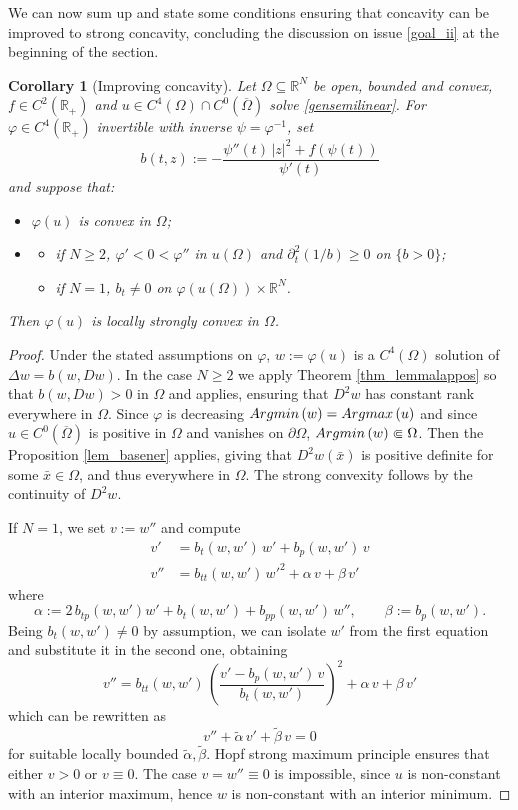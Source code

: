 \documentclass[12pt]{amsart}
\numberwithin{equation}{section}
\theoremstyle{plain}
\theoremstyle{plain}
\theoremstyle{plain}
\newtheorem{corollary}[theorem]{Corollary}
\theoremstyle{definition}
\newcommand{\R}{{\mathbb R}}
\renewcommand{\ge}{\geqslant}
\begin{document}
We can now sum up and state some conditions ensuring that concavity can be improved to strong concavity, concluding the discussion on issue \eqref{goal_ii} at the beginning of the section.

 \begin{corollary}[Improving concavity]
 \label{corstrongconv}
 Let $\Omega\subseteq \R^N$ be open, bounded and convex, $f\in C^2(\R_+)$ and $u\in C^4(\Omega)\cap C^0(\overline{\Omega})$ solve \eqref{gensemilinear}.
For $\varphi\in C^4(\R_+)$ invertible with inverse $\psi=\varphi^{-1}$, set
 \[
 b(t, z):=-\frac{\psi''(t)\, |z|^2+f(\psi(t))}{\psi'(t)}
 \]
and suppose that:
\begin{itemize}
 \item[i)]
 $\varphi(u)$ is convex in $\Omega$;
 \item[ii)]
\begin{itemize}
\item if $N\ge 2$, $\varphi'< 0<\varphi''$ in $u(\Omega)$ and $ \partial^2_t(1/b)\ge 0$ on $\{b>0\}$;
\item if $N=1$, $b_t\neq 0$ on $\varphi(u(\Omega))\times \R^N$.
\end{itemize}
 \end{itemize}
 Then $\varphi(u)$ is locally strongly convex in $\Omega$. 
 \end{corollary} 
 
 \begin{proof}
Under the stated assumptions on $\varphi$, $w:=\varphi(u)$ is a $C^4(\Omega)$ solution of $\Delta w=b(w, Dw)$. 
In the case $N\ge 2$ we apply Theorem \ref{thm_lemmalappos} so that $b(w, Dw)>0$ in $\Omega$ and \cite{KoLe87} applies, ensuring that $D^2 w$ has constant rank everywhere in $\Omega$. 
Since $\varphi$ is decreasing ${\rm Argmin}\, (w)={\rm Argmax}\, (u)$ and since $u\in C^0(\overline{\Omega})$ is positive in $\Omega$ and vanishes on $\partial\Omega$, ${\rm Argmin}\, (w)\Subset \Omega$. 
Then the Proposition \ref{lem_basener} applies, giving that $D^2w(\bar{x})$ is positive definite for some $\bar{x}\in \Omega$, and thus everywhere in $\Omega$. 
The strong convexity follows by the continuity of $D^2w$.
 
 If $N=1$, we set $v:=w''$ and compute
\[
\begin{split}
v'&=b_t(w, w')\, w'+b_p(w, w')\, v\\
v''&=b_{tt}(w, w')\, w'^2+\alpha\, v+\beta\, v'
\end{split}
\]
where
\[
\alpha:=2\, b_{tp}(w, w') w'+b_t(w, w')+b_{pp}(w, w')\, w'',\qquad \beta:=b_p(w, w').
\]
Being $b_t(w,w')\neq 0$ by assumption, we can isolate $w'$ from the first equation and substitute it in the second one, obtaining
$$v'' = b_{tt}(w, w')\, \left(\frac{v' - b_p(w,w')\, v}{b_t(w,w')}\right)^2+\alpha\, v+\beta\, v'$$
which can be rewritten as
\[
v''+\tilde{\alpha}\, v'+\tilde{\beta}\, v = 0
\]
for suitable locally bounded $\tilde{\alpha}, \tilde{\beta}$. Hopf strong maximum principle \cite[Theorem 2.1.2]{PuSe07} ensures that either $v>0$ or $v\equiv 0$.
The case $v=w''\equiv 0$ is impossible, since $u$ is non-constant with an interior maximum, hence $w$ is non-constant with an interior minimum.
 \end{proof}
\end{document}
